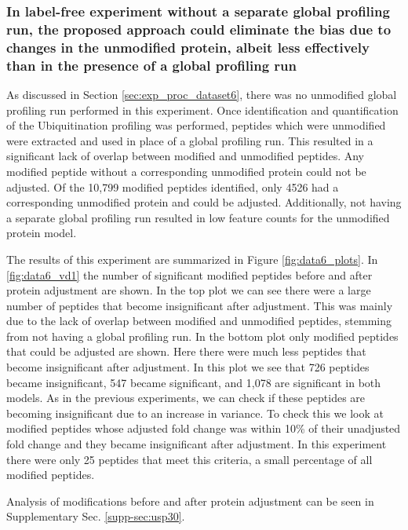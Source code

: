 \documentclass[mcp]{article}
\numberwithin{table}{section}
\begin{document}
\subsubsection*{In label-free experiment without a separate global profiling run, the proposed approach could eliminate the bias due to changes in the unmodified protein, albeit less effectively than in the presence of a global profiling run}

As discussed in Section \ref{sec:exp_proc_dataset6}, there was no unmodified global profiling run performed in this experiment. Once identification and quantification of the Ubiquitination profiling was performed, peptides which were unmodified were extracted and used in place of a global profiling run. This resulted in a significant lack of overlap between modified and unmodified peptides. Any modified peptide without a corresponding unmodified protein could not be adjusted. Of the 10,799 modified peptides identified, only 4526 had a corresponding unmodified protein and could be adjusted. Additionally, not having a separate global profiling run resulted in low feature counts for the unmodified protein model.

The results of this experiment are summarized in Figure \ref{fig:data6_plots}. In \ref{fig:data6_vd1} the number of significant modified peptides before and after protein adjustment are shown. In the top plot we can see there were a large number of peptides that become insignificant after adjustment. This was mainly due to the lack of overlap between modified and unmodified peptides, stemming from not having a global profiling run. In the bottom plot only modified peptides that could be adjusted are shown. Here there were much less peptides that become insignificant after adjustment. In this plot we see that 726 peptides became insignificant, 547 became significant, and 1,078 are significant in both models. As in the previous experiments, we can check if these peptides are becoming insignificant due to an increase in variance. To check this we look at modified peptides whose adjusted fold change was within 10\% of their unadjusted fold change and they became insignificant after adjustment. In this experiment there were only 25 peptides that meet this criteria, a small percentage of all modified peptides.

Analysis of modifications before and after protein adjustment can be seen in Supplementary Sec. \ref{supp-sec:usp30}.

\end{document}
